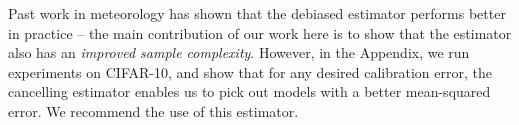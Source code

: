 Past work in meteorology has shown that the debiased estimator performs better in practice -- the main contribution of our work here is to show that the estimator also has an \emph{improved sample complexity}. However, in the Appendix, we run experiments on CIFAR-10, and show that for any desired calibration error, the cancelling estimator enables us to pick out models with a better mean-squared error. We recommend the use of this estimator.




